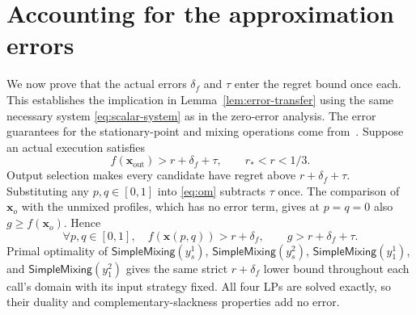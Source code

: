 \documentclass[11pt]{article}
\theoremstyle{remark}
\theoremstyle{plain}
\newcommand{\sm}{\mathsf{SimpleMixing}}
\begin{document}
\section{Accounting for the approximation errors}
\label{app:errors}

We now prove that the actual errors $\delta_f$ and $\tau$ enter
the regret bound once each. This establishes the implication in
Lemma~\ref{lem:error-transfer} using the same necessary system
\eqref{eq:scalar-system} as in the zero-error analysis. The error
guarantees for the stationary-point and mixing operations come
from~\cite{ts2008,dfm2023,automating2025,mixing2025}.
Suppose an actual execution satisfies
\begin{equation}
 f(\boldsymbol x_{\mathrm{out}})>r+\delta_f+\tau,
 \qquad r_*<r<1/3.
 \label{eq:finite-error-failure}
\end{equation}
Output selection makes every candidate have regret above
$r+\delta_f+\tau$.
Substituting any $p,q\in[0,1]$ into \eqref{eq:om} subtracts $\tau$
once. The comparison of $\boldsymbol x_o$ with the unmixed profiles,
which has no error term, gives at $p=q=0$ also
$g\ge f(\boldsymbol x_o)$. Hence
\begin{equation}
 \forall p,q\in[0,1],\quad f(\boldsymbol x(p,q))>r+\delta_f,
 \qquad g>r+\delta_f+\tau.
 \label{eq:finite-error-rectangle-failure}
\end{equation}
Primal optimality of $\sm(y_s^1)$, $\sm(y_s^2)$,
$\sm(y_1^1)$, and $\sm(y_1^2)$ gives the same strict
$r+\delta_f$ lower bound throughout each call's domain with its input
strategy fixed. All four LPs are solved exactly, so their
duality and complementary-slackness properties add no error.
\end{document}
